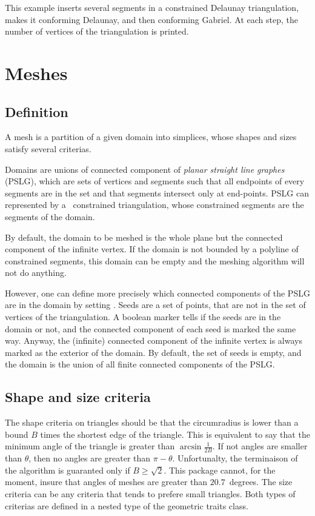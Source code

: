 This example inserts several segments in a constrained Delaunay
triangulation, makes it conforming Delaunay, and then conforming
Gabriel. At each step, the number of vertices of the triangulation is
printed.


\section{Meshes}
\label{sec:Mesh_2_meshes}


\subsection{Definition}
\label{sec:Mesh_2_meshes_definition}

A mesh is a partition of a given domain into simplices, whose shapes
and sizes satisfy several criterias.

Domains are unions of connected component of \emph{planar straight
  line graphes} (PSLG), which are sets of vertices and segments such
that all endpoints of every segments are in the set and that segments
intersect only at end-points. PSLG can represented by a \cgal\ 
constrained triangulation, whose constrained segments are the segments
of the domain.

By default, the domain to be meshed is the whole plane but the
connected component of the infinite vertex. If the domain is not
bounded by a polyline of constrained segments, this domain can be
empty and the meshing algorithm will not do anything.

However, one can define more precisely which connected components of
the PSLG are in the domain by setting \ccc{seeds}. Seeds are a set of
points, that are not in the set of vertices of the triangulation. A
boolean marker tells if the seeds are in the domain or not, and the
connected component of each seed is marked the same way. Anyway, the
(infinite) connected component of the infinite vertex is always marked
as the exterior of the domain. By default, the set of seeds is empty,
and the domain is the union of all finite connected components of the
PSLG.

\subsection{Shape and size criteria}
\label{sec:Mesh_2_criteria}

The shape criteria on triangles should be that the circumradius is
lower than a bound $B$ times the shortest edge of the triangle. This
is equivalent to say that the minimum angle of the triangle is greater
than $\arcsin{\frac{1}{2B}}$. If not angles are smaller than $\theta$,
then no angles are greater than $\pi - \theta$. Unfortunalty, the
terminaison of the algorithm is guaranted only if $B \ge \sqrt{2}$.
This package cannot, for the moment, insure that angles of meshes are
greater than $20.7$~degrees. The size criteria can be any criteria that
tends to prefere small triangles. Both types of criterias are defined
in a nested type \ccc{Is_bad} of the geometric traits class.

